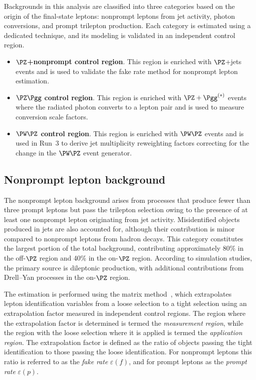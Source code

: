 Backgrounds in this analysis are classified into three categories based on the origin of the final-state leptons: nonprompt leptons from jet activity, photon conversions, and prompt trilepton production. Each category is estimated using a dedicated technique, and its modeling is validated in an independent control region.
\begin{itemize}
  \item \textbf{$\PZ$+nonprompt control region}. This region is enriched with $\PZ$+jets events and is used to validate the fake rate method for nonprompt lepton estimation.
  \item \textbf{$\PZ\Pgg$ control region}. This region is enriched with $\PZ+\Pgg^{(*)}$ events where the radiated photon converts to a lepton pair and is used to measure conversion scale factors.
  \item \textbf{$\PW\PZ$ control region}. This region is enriched with $\PW\PZ$ events and is used in Run~3 to derive jet multiplicity reweighting factors correcting for the change in the $\PW\PZ$ event generator.
\end{itemize}

\subsection{Nonprompt lepton background}
\label{ssec:nonprompt}

The nonprompt lepton background arises from processes that produce fewer than three prompt leptons but pass the trilepton selection owing to the presence of at least one nonprompt lepton originating from jet activity. Misidentified objects produced in jets are also accounted for, although their contribution is minor compared to nonprompt leptons from hadron decays. This category constitutes the largest portion of the total background, contributing approximately 80\% in the off-$\PZ$ region and 40\% in the on-$\PZ$ region. According to simulation studies, the primary source is dileptonic \ttbar production, with additional contributions from Drell--Yan processes in the on-$\PZ$ region.

The estimation is performed using the matrix method~\cite{D0MtxMethod,CMSFRMethod}, which extrapolates lepton identification variables from a loose selection to a tight selection using an extrapolation factor measured in independent control regions. The region where the extrapolation factor is determined is termed the \textit{measurement region}, while the region with the loose selection where it is applied is termed the \textit{application region}. The extrapolation factor is defined as the ratio of objects passing the tight identification to those passing the loose identification. For nonprompt leptons this ratio is referred to as the \textit{fake rate} $\varepsilon(f)$, and for prompt leptons as the \textit{prompt rate} $\varepsilon(p)$.

